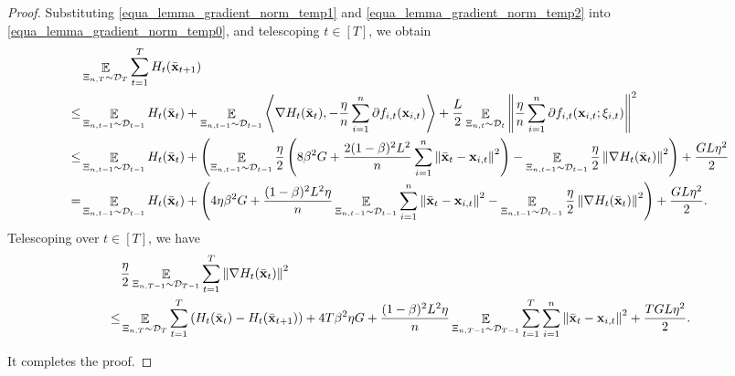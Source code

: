 \documentclass{article}
\begin{document}
\begin{proof}
Substituting \eqref{equa_lemma_gradient_norm_temp1} and \eqref{equa_lemma_gradient_norm_temp2} into \eqref{equa_lemma_gradient_norm_temp0}, and telescoping $t\in[T]$, we obtain
\begin{align}
\nonumber
& \mathop{\mathbb{E}}_{ \Xi_{n,T} \sim \mathcal{D}_{T} } \sum_{t=1}^T H_t(\bar{{\bf x}}_{t+1}) \\ \nonumber
\le & \mathop{\mathbb{E}}_{ \Xi_{n,t-1} \sim \mathcal{D}_{t-1} } H_t(\bar{{\bf x}}_t) + \mathop{\mathbb{E}}_{ \Xi_{n,t-1} \sim \mathcal{D}_{t-1} }\left\langle\nabla H_t(\bar{{\bf x}}_t), -\frac{\eta}{n}\sum_{i=1}^n \partial f_{i,t}({\bf x}_{i,t}) \right\rangle + \frac{L}{2} \mathop{\mathbb{E}}_{ \Xi_{n,t} \sim \mathcal{D}_{t} }\left\lVert\frac{\eta}{n}\sum_{i=1}^n \partial f_{i,t}({\bf x}_{i,t};\xi_{i,t})\right\rVert^2 \\ \nonumber
\le & \mathop{\mathbb{E}}_{ \Xi_{n,t-1} \sim \mathcal{D}_{t-1} } H_t(\bar{{\bf x}}_t) + \left(  \mathop{\mathbb{E}}_{ \Xi_{n,t-1} \sim \mathcal{D}_{t-1} } \frac{\eta}{2}\left(  8\beta^2 G + \frac{2(1-\beta)^2L^2}{n}\sum_{i=1}^n \left\lVert \bar{{\bf x}}_t - {\bf x}_{i,t} \right\rVert^2  \right)  - \mathop{\mathbb{E}}_{ \Xi_{n,t-1} \sim \mathcal{D}_{t-1} } \frac{\eta}{2} \left\lVert\nabla H_t(\bar{{\bf x}}_t)\right\rVert^2  \right) + \frac{GL\eta^2}{2} \\ \nonumber
= & \mathop{\mathbb{E}}_{ \Xi_{n,t-1} \sim \mathcal{D}_{t-1} } H_t(\bar{{\bf x}}_t) + \left(   4\eta\beta^2 G + \frac{(1-\beta)^2L^2 \eta}{n}\mathop{\mathbb{E}}_{ \Xi_{n,t-1} \sim \mathcal{D}_{t-1} }\sum_{i=1}^n \left\lVert \bar{{\bf x}}_t - {\bf x}_{i,t} \right\rVert^2   - \mathop{\mathbb{E}}_{ \Xi_{n,t-1} \sim \mathcal{D}_{t-1} } \frac{\eta}{2} \left\lVert\nabla H_t(\bar{{\bf x}}_t)\right\rVert^2  \right) + \frac{GL\eta^2}{2}.
\end{align} Telescoping over $t\in[T]$, we have
\begin{align}
& \frac{\eta}{2} \mathop{\mathbb{E}}_{ \Xi_{n,T-1} \sim \mathcal{D}_{T-1} }\sum_{t=1}^T \left\lVert\nabla H_t(\bar{{\bf x}}_t)\right\rVert^2 \\ \nonumber
\le & \mathop{\mathbb{E}}_{ \Xi_{n,T} \sim \mathcal{D}_{T} } \sum_{t=1}^T  \left( H_t(\bar{{\bf x}}_t) - H_t(\bar{{\bf x}}_{t+1}) \right) + 4T\beta^2 \eta G + \frac{(1-\beta)^2L^2 \eta}{n}\mathop{\mathbb{E}}_{ \Xi_{n,T-1} \sim \mathcal{D}_{T-1} }\sum_{t=1}^T\sum_{i=1}^n \left\lVert \bar{{\bf x}}_t - {\bf x}_{i,t} \right\rVert^2 + \frac{TGL\eta^2}{2}.
\end{align} 





It completes the proof.
\end{proof}
\end{document}
